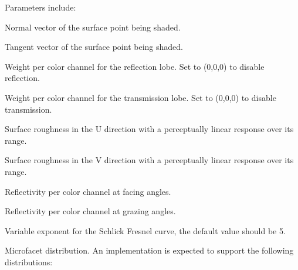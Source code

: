 \documentclass[11pt,letterpaper]{book}
\begin{document}
\noindent Parameters include:

  \vspace{12pt}
  Normal vector of the surface point being shaded.
  \apiend
  \vspace{-16pt}
  
  \vspace{12pt}
  Tangent vector of the surface point being shaded.
  \apiend
  \vspace{-16pt}
  
  \vspace{12pt}
  Weight per color channel for the reflection lobe. Set to (0,0,0) to disable
  reflection.
  \apiend
  \vspace{-16pt}
  
  \vspace{12pt}
  Weight per color channel for the transmission lobe. Set to (0,0,0) to
  disable transmission.
  \apiend
  \vspace{-16pt}
  
  \vspace{12pt}
  Surface roughness in the U direction with a perceptually linear response
  over its range.
  \apiend
  \vspace{-16pt}
  
  \vspace{12pt}
  Surface roughness in the V direction with a perceptually linear response
  over its range.
  \apiend
  \vspace{-16pt}
  
  \vspace{12pt}
  Reflectivity per color channel at facing angles.
  \apiend
  \vspace{-16pt}
  
  \vspace{12pt}
  Reflectivity per color channel at grazing angles.
  \apiend
  \vspace{-16pt}
  
  \vspace{12pt}
  Variable exponent for the Schlick Fresnel curve, the default value should be
  5.
  \apiend
  \vspace{-16pt}
  
  \vspace{12pt}
  Microfacet distribution. An implementation is expected to support the
  following distributions: 
  \apiend
  \vspace{-16pt}
  
\end{document}
